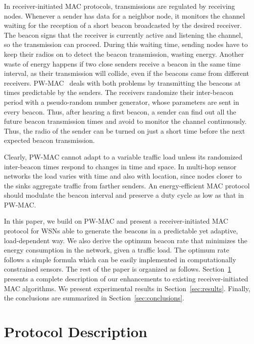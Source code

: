 \documentclass[journal,english,twocolumn,10pt,letterpaper]{IEEEtran}
\begin{document}
In receiver-initiated MAC protocols, transmissions are regulated by receiving
nodes. Whenever a sender has data for a neighbor node, it monitors the channel
waiting for the reception of a short beacon broadcasted by the desired
receiver. The beacon signs that the receiver is currently active and listening
the channel, so the transmission can proceed. During this waiting time,
sending nodes have to keep their radios on to detect the beacon transmission,
wasting energy. Another waste of energy happens if two close senders receive a
beacon in the same time interval, as their transmission will collide, even if
the beacons came from different receivers. PW-MAC~\cite{tang11:_pw_macy} deals
with both problems by transmitting the beacons at times predictable by the
senders. The receivers randomize their inter-beacon period with a
pseudo-random number generator, whose parameters are sent in every beacon.
Thus, after hearing a first beacon, a sender can find out all the future
beacon transmission times and avoid to monitor the channel continuously. Thus,
the radio of the sender can be turned on just a short time before the next
expected beacon transmission.

Clearly, PW-MAC cannot adapt to a variable traffic load unless its randomized
inter-beacon times respond to changes in time and space. In multi-hop sensor
networks the load varies with time and also with location, since nodes closer
to the sinks aggregate traffic from farther senders. An energy-efficient MAC
protocol should modulate the beacon interval and preserve a duty cycle as low
as that in PW-MAC.



In this paper, we build on PW-MAC and present a receiver-initiated MAC
protocol for WSNs able to generate the beacons in a predictable yet adaptive,
load-dependent way. We also derive the optimum beacon rate that minimizes the
energy consumption in the network, given a traffic load. The optimum rate
follows a simple formula which can be easily implemented in computationally
constrained sensors. The rest of the paper is organized as follows.
Section~\ref{sec:rate-adaption-at} presents a complete description of our
enhancements to existing receiver-initiated MAC algorithms. We present
experimental results in Section~\ref{sec:results}. Finally, the conclusions
are summarized in Section~\ref{sec:conclusions}.

\section{Protocol Description}
\label{sec:rate-adaption-at}
\end{document}
